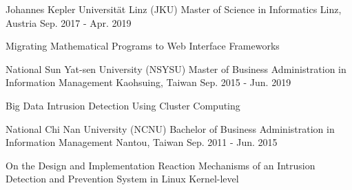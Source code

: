 


\begin{cventries}


\cventry
{Johannes Kepler Universität Linz (JKU)} %
{Master of Science in Informatics} %
{Linz, Austria} %
{Sep. 2017 - Apr. 2019} %
{ %
\begin{cvitems}
\item {Migrating Mathematical Programs to Web Interface Frameworks}
\end{cvitems}
}



\cventry
{National Sun Yat-sen University (NSYSU)} %
{Master of Business Administration in Information Management} %
{Kaohsuing, Taiwan} %
{Sep. 2015 - Jun. 2019} %
{ %
\begin{cvitems}
\item {Big Data Intrusion Detection Using Cluster Computing}
\end{cvitems}
}



\cventry
{National Chi Nan University (NCNU)} %
{Bachelor of Business Administration in Information Management} %
{Nantou, Taiwan} %
{Sep. 2011 - Jun. 2015} %
{ %
\begin{cvitems}
\item {On the Design and Implementation Reaction Mechanisms of an Intrusion Detection and Prevention System in Linux Kernel-level}
\end{cvitems}
}


\end{cventries}